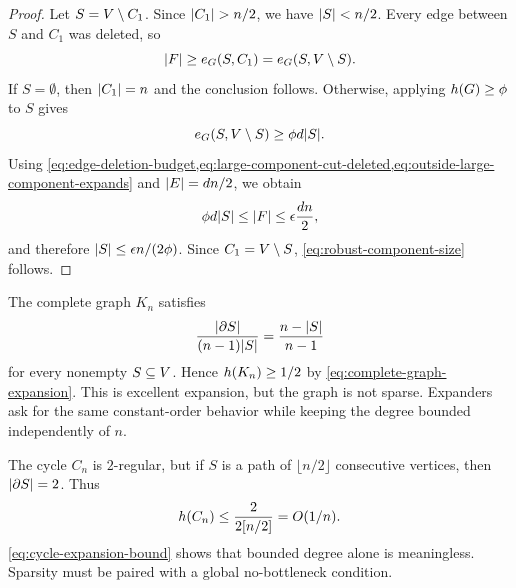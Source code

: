\begin{proof}
	Let \(S=V\setminus C_1\). Since \(\lvert C_1\rvert>n/2\), we have \(\lvert S\rvert<n/2\). Every edge between \(S\) and \(C_1\) was deleted, so
	\begin{equation}
		\label{eq:large-component-cut-deleted}
		\lvert F\rvert\geq e_{G}(S,C_1)=e_{G}(S,V\setminus S).
	\end{equation}
	If \(S=\emptyset\), then \(\lvert C_1\rvert=n\) and the conclusion follows. Otherwise, applying \(h(G)\geq\phi\) to \(S\) gives
	\begin{equation}
		\label{eq:outside-large-component-expands}
		e_{G}(S,V\setminus S)\geq \phi d\lvert S\rvert.
	\end{equation}
	Using \cref{eq:edge-deletion-budget,eq:large-component-cut-deleted,eq:outside-large-component-expands} and \(\lvert E\rvert=dn/2\), we obtain
	\begin{equation}
		\label{eq:outside-large-component-size}
		\phi d\lvert S\rvert\leq \lvert F\rvert\leq \epsilon\frac{dn}{2},
	\end{equation}
	and therefore \(\lvert S\rvert\leq \epsilon n/(2\phi)\). Since \(C_1=V\setminus S\), \cref{eq:robust-component-size} follows.
\end{proof}

\begin{example}
	\label{ex:complete-graph}
	The complete graph \(K_n\) satisfies
	\begin{equation}
		\label{eq:complete-graph-expansion}
		\frac{\lvert\partial S\rvert}{(n-1)\lvert S\rvert}=\frac{n-\lvert S\rvert}{n-1}
	\end{equation}
	for every nonempty \(S\subseteq V\). Hence \(h(K_n)\geq 1/2\) by \cref{eq:complete-graph-expansion}. This is excellent expansion, but the graph is not sparse. Expanders ask for the same constant-order behavior while keeping the degree bounded independently of \(n\).
\end{example}

\begin{example}[Cycle]
	\label{ex:cycle}
	The cycle \(C_n\) is \(2\)-regular, but if \(S\) is a path of \(\lfloor n/2\rfloor\) consecutive vertices, then \(\lvert\partial S\rvert=2\). Thus
	\begin{equation}
		\label{eq:cycle-expansion-bound}
		\EdgeExpansion(C_n)\leq \frac{2}{2\lfloor n/2\rfloor}=\bigO(1/n).
	\end{equation}
	\cref{eq:cycle-expansion-bound} shows that bounded degree alone is meaningless. Sparsity must be paired with a global no-bottleneck condition.
\end{example}

